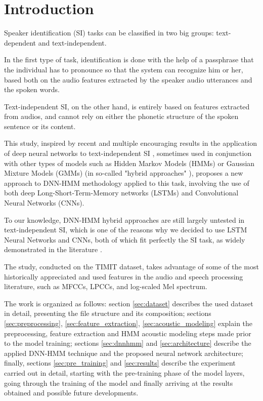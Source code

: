 \section{Introduction}
Speaker identification (SI) tasks can be classified in two big groups: text-dependent and text-independent.

In the first type of task, identification is done with the help of a passphrase that the individual has to pronounce so that the system can recognize him or her, based both on the audio features extracted by the speaker audio utterances and the spoken words.

Text-independent SI, on the other hand, is entirely based on features extracted from audios, and cannot rely on either the phonetic structure of the spoken sentence or its content.

This study, inspired by recent and multiple encouraging results in the application of deep neural networks to text-independent SI \cite{si:lstm}, sometimes used in conjunction with other types of models such as Hidden Markov Models (HMMs) or Gaussian Mixture Models (GMMs) (in so-called "hybrid approaches" \cite{si:dnnhmm}), proposes a new approach to DNN-HMM methodology applied to this task, involving the use of both deep Long-Short-Term-Memory networks (LSTMs) and Convolutional Neural Networks (CNNs).

To our knowledge, DNN-HMM hybrid approaches are still largely untested in text-independent SI, which is one of the reasons why we decided to use LSTM Neural Networks and CNNs, both of which fit perfectly the SI task, as widely demonstrated in the literature \cite{si:cnn} \cite{si:lstm}.

The study, conducted on the TIMIT dataset, takes advantage of some of the most historically appreciated and used features in the audio and speech processing literature, such as MFCCs, LPCCs, and log-scaled Mel spectrum.

The work is organized as follows: section \vref{sec:dataset} describes the used dataset in detail, presenting the file structure and its composition; sections \vref{sec:preprocessing}, \vref{sec:feature_extraction}, \vref{sec:acoustic_modeling} explain the preprocessing, feature extraction and HMM acoustic modeling steps made prior to the model training; sections \vref{sec:dnnhmm} and \vref{sec:architecture} describe the applied DNN-HMM technique and the proposed neural network architecture; finally, sections \vref{sec:pre_training} and \vref{sec:results} describe the experiment carried out in detail, starting with the pre-training phase of the model layers, going through the training of the model and finally arriving at the results obtained and possible future developments. 